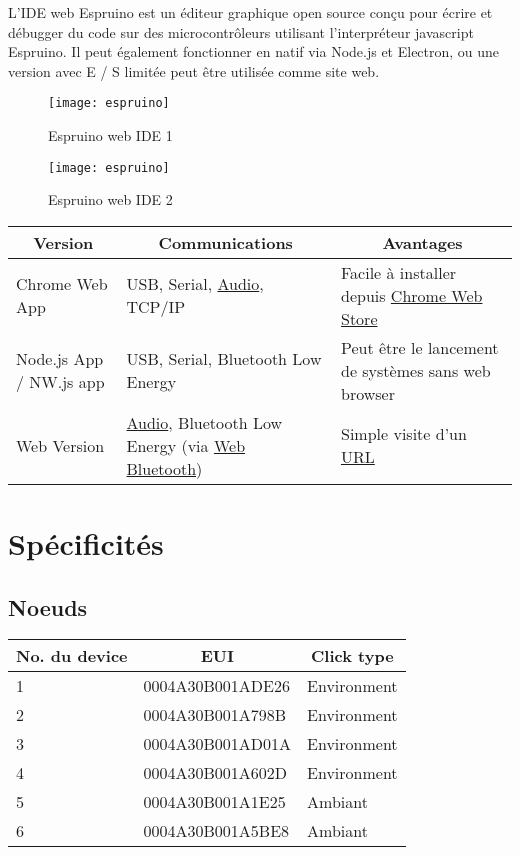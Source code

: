 L'IDE web Espruino est un éditeur graphique open source conçu pour écrire et débugger du code sur des microcontrôleurs utilisant l'interpréteur javascript Espruino. Il peut également fonctionner en natif via Node.js et Electron, ou une version avec E / S limitée peut être utilisée comme site web.
\vspace{2mm}

\begin{figure}[h!]
\texttt{[image: espruino]}
\caption{Espruino web IDE 1}
\end{figure}

\begin{figure}[h!]
\texttt{[image: espruino]}
\caption{Espruino web IDE 2}
\end{figure}

\renewcommand{\arraystretch}{1.2}
\begin{tabular}{|p{4.5cm}|p{5.3cm}|p{6cm}|}
\hline
\multicolumn{1}{|c|}{\textbf{Version}} & \multicolumn{1}{|c|}{\textbf{Communications}} & \multicolumn{1}{|c|}{\textbf{Avantages}} \\
\hline
Chrome Web App & USB, Serial, \href{http://www.espruino.com/Headphone}{Audio}, TCP/IP & Facile à installer depuis \href{https://chrome.google.com/webstore/detail/espruino-web-ide/bleoifhkdalbjfbobjackfdifdneehpo}{Chrome Web Store} \\
\hline
Node.js App / NW.js app & USB, Serial, Bluetooth Low Energy & Peut être le lancement de systèmes sans web browser \\
\hline
Web Version & \href{http://www.espruino.com/Headphone}{Audio}, Bluetooth Low Energy (via \href{https://webbluetoothcg.github.io/web-bluetooth/}{Web Bluetooth}) & Simple visite d'un \href{https://espruino.github.io/EspruinoWebIDE/}{URL} \\
\hline
\end{tabular}
\renewcommand{\arraystretch}{1}

\section{Spécificités}
\subsection{Noeuds}

\renewcommand{\arraystretch}{1.2}
\begin{tabular}{|l|l|l|}
\hline
\multicolumn{1}{|c|}{\textbf{No. du device}} & \multicolumn{1}{|c|}{\textbf{EUI}} & \multicolumn{1}{|c|}{\textbf{Click type}} \\
\hline
1 & 0004A30B001ADE26 & Environment \\
2 & 0004A30B001A798B & Environment \\
3 & 0004A30B001AD01A & Environment \\
4 & 0004A30B001A602D & Environment \\
5 & 0004A30B001A1E25 & Ambiant \\
6 & 0004A30B001A5BE8 & Ambiant \\
\hline
\end{tabular}
\renewcommand{\arraystretch}{1}

